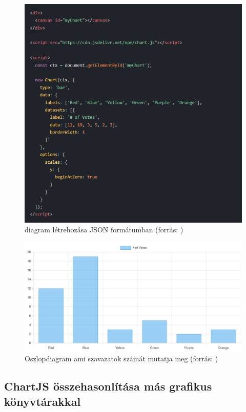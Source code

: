 \begin{figure}[h]
\centering
\includegraphics[scale=0.6]{images/chartExample.png}
\caption{diagram létrehozása JSON formátumban (forrás: \cite{ChartJS})}
\end{figure}

\begin{figure}[h]
\centering
\includegraphics[scale=0.3]{images/barChartJSExample.png}
\caption{Oszlopdiagram ami szavazatok számát mutatja meg (forrás: \cite{ChartJS})}
\end{figure}

\subsection{ChartJS összehasonlítása más grafikus könyvtárakkal \cite{wikiChart}}

